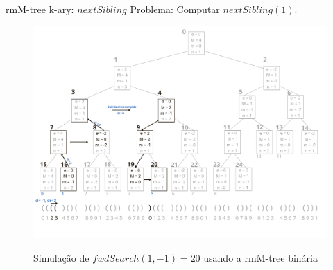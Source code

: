 \begin{frame}{rmM-tree k-ary: $nextSibling$}
    Problema: Computar $nextSibling(1)$.
     \begin{figure}[h!]
         \centering
         \includegraphics[scale=0.27]{images/rmm-tree-bin-fwdSearch.png}\\
         \caption{Simulação de $fwdSearch(1,-1)=20$ usando a rmM-tree binária}
     \end{figure} 
 \end{frame}


